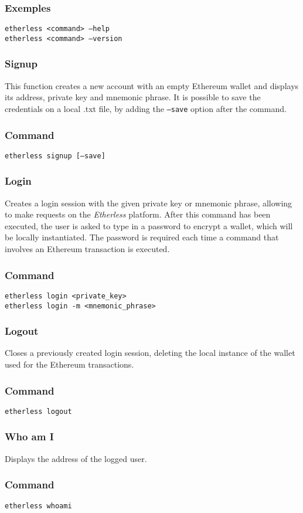 	\subsubsection*{Exemples}
	\texttt{etherless <command> ---help} \\
	\texttt{etherless <command> ---version}
	\subsubsection{Signup}
	This function creates a new account with an empty Ethereum wallet and displays its address, private key and mnemonic phrase. It is possible to save the credentials on a local .txt file, by adding the \texttt{---save} option after the command.
	\subsubsection*{Command}
	\texttt{etherless signup [---save]}
	\subsubsection{Login}
	Creates a login session with the given private key or mnemonic phrase, allowing to make requests on the \textit{Etherless} platform. After this command has been executed, the user is asked to type in a password to encrypt a wallet, which will be locally instantiated. The password is required each time a command that involves an Ethereum transaction is executed.
	\subsubsection*{Command}
	\texttt{etherless login <private\_key>} \\
	\texttt{etherless login -m <mnemonic\_phrase>}
	\subsubsection{Logout}
	Closes a previously created login session, deleting the local instance of the wallet used for the Ethereum transactions.
	\subsubsection*{Command}
	\texttt{etherless logout}
	\subsubsection{Who am I}
	Displays the address of the logged user.
	\subsubsection*{Command}
	\texttt{etherless whoami}
